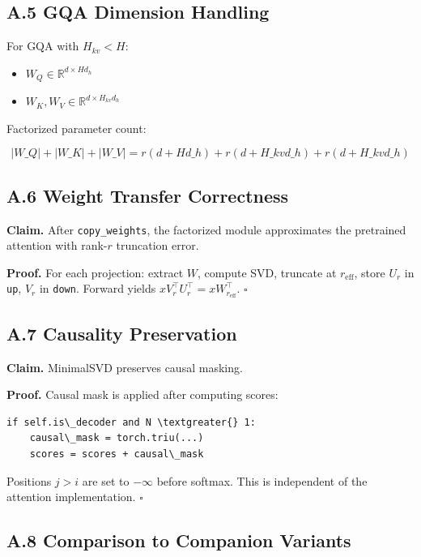 \subsection{A.5 GQA Dimension Handling}

For GQA with $H_{kv} < H$:
\begin{itemize}
\item $W_Q \in \mathbb{R}^{d \times H d_h}$
\item $W_K, W_V \in \mathbb{R}^{d \times H_{kv} d_h}$

\end{itemize}
Factorized parameter count:

\[
|W\_Q| + |W\_K| + |W\_V| = r(d + H d\_h) + r(d + H\_{kv} d\_h) + r(d + H\_{kv} d\_h)
\tag{A.4}
\]

\subsection{A.6 Weight Transfer Correctness}

\textbf{Claim.} After \texttt{copy\_weights}, the factorized module approximates the 
pretrained attention with rank-$r$ truncation error.

\textbf{Proof.} For each projection: extract $W$, compute SVD, truncate at 
$r_\text{eff}$, store $U_r$ in \texttt{up}, $V_r$ in \texttt{down}. Forward yields 
$x V_r^\top U_r^\top = x W_{r_\text{eff}}^\top$. $\square$

\subsection{A.7 Causality Preservation}

\textbf{Claim.} MinimalSVD preserves causal masking.

\textbf{Proof.} Causal mask is applied after computing scores:

\begin{lstlisting}
if self.is\_decoder and N \textgreater{} 1:
    causal\_mask = torch.triu(...)
    scores = scores + causal\_mask
\end{lstlisting}

Positions $j > i$ are set to $-\infty$ before softmax. This is independent 
of the attention implementation. $\square$

\subsection{A.8 Comparison to Companion Variants}

